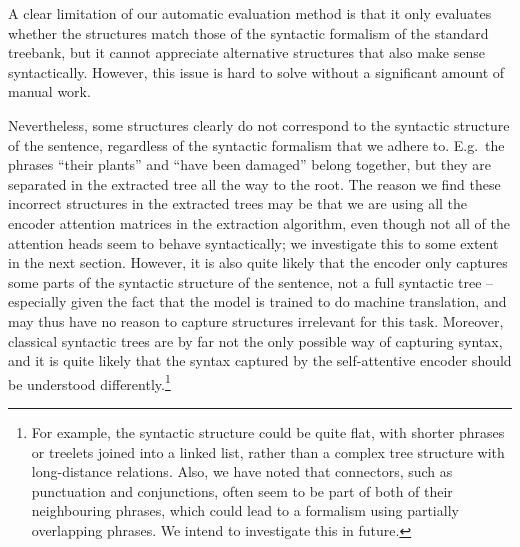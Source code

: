 \documentclass[11pt,a4paper]{article}
\def\RR#1{{\color{blue}RR: \it #1}}
\def\RR#1{}
\begin{document}
A clear limitation of our automatic evaluation method is that it only evaluates whether the structures match those of the syntactic formalism of the standard treebank, but it cannot appreciate alternative structures that also make sense syntactically.
However, this issue is hard to solve without a significant amount of manual work.

Nevertheless, some structures clearly do not correspond to the syntactic structure of the sentence, regardless of the syntactic formalism that we adhere to. E.g.\ 
the phrases ``their plants'' and ``have been damaged'' belong together, but they are separated in the extracted tree all the way to the root.
The reason we find
these incorrect structures in the extracted trees
may be
that we are using all the encoder attention matrices in the extraction algorithm, even though not all of the attention heads seem to behave syntactically; we investigate this to some extent in the next section.
However, it is also quite likely that the encoder only captures some parts of the syntactic structure of the sentence, not a full syntactic tree
-- especially given the fact that the model is trained to do machine translation, and may thus have no reason to capture structures irrelevant for this task.
%
Moreover, classical syntactic trees are by far not the only possible way of capturing syntax, and it is quite likely that the syntax captured by the self-attentive encoder should be understood differently.\footnote{For example, the syntactic structure could be quite flat, with shorter phrases or treelets joined into a linked list, rather than a complex tree structure with long-distance relations.
Also, we have noted that connectors, such as punctuation and conjunctions, often seem to be part of both of their neighbouring phrases, which could lead to a formalism using partially overlapping phrases.
We intend to investigate this in future.}




\end{document}
